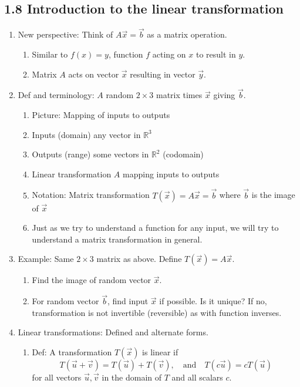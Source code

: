 \documentclass{article}
\begin{document}
\subsection{1.8 Introduction to the linear transformation}

\begin{enumerate}

\item New perspective: Think of $A\vec{x} = \vec{b}$ as a matrix operation.
\begin{enumerate}
\item Similar to $f(x) = y$, function $f$ acting on $x$ to result in $y$.
\item Matrix $A$ acts on vector $\vec{x}$ resulting in vector $\vec{y}$.
\end{enumerate}

\item Def and terminology: $A$ random $2 \times 3$ matrix times $\vec{x}$ giving $\vec{b}$. 
\begin{enumerate}
\item Picture: Mapping of inputs to outputs
\item Inputs (domain) any vector in $\mathbb{R}^3$
\item Outputs (range) some vectors in $\mathbb{R}^2$ (codomain)
\item Linear transformation $A$ mapping inputs to outputs
\item Notation: Matrix transformation $T(\vec{x}) = A\vec{x} = \vec{b}$ where $\vec{b}$ is the image of $\vec{x}$
\item Just as we try to understand a function for any input, we will try to understand a matrix transformation in general.
\end{enumerate}

\item Example: Same $2 \times 3$ matrix as above. Define $T(\vec{x}) = A\vec{x}$. 
\begin{enumerate}
\item Find the image of random vector $\vec{x}$.
\item For random vector $\vec{b}$, find input $\vec{x}$ if possible. Is it unique? If no, transformation is not invertible (reversible) as with function inverses.
\end{enumerate}

\item Linear transformations: Defined and alternate forms.
\begin{enumerate}
\item Def: A transformation $T(\vec{x})$ is linear if
\[
T(\vec{u}+\vec{v}) = T(\vec{u})+T(\vec{v}), 
\quad \text{and} \quad 
T(c\vec{u}) = cT(\vec{u})
\]
for all vectors $\vec{u}, \vec{v}$ in the domain of $T$ and all scalars $c$.


\end{enumerate}
\end{enumerate}
\end{document}
